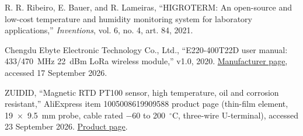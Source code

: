 \documentclass[11pt, letterpaper]{article}
\begin{document}
\begin{enumerate}[label={[\arabic*]}, noitemsep]
\item R. R. Ribeiro, E. Bauer, and R. Lameiras, ``HIGROTERM: An open-source and low-cost temperature and humidity monitoring system for laboratory applications,'' \textit{Inventions}, vol. 6, no. 4, art. 84, 2021.
\item Chengdu Ebyte Electronic Technology Co., Ltd., ``E220-400T22D user manual: 433/470~MHz 22~dBm LoRa wireless module,'' v1.0, 2020. \href{https://www.cdebyte.com/products/E220-400T22D}{Manufacturer page}, accessed 17 September 2026.
\item ZUIDID, ``Magnetic RTD PT100 sensor, high temperature, oil and corrosion resistant,'' AliExpress item 1005008619909588 product page (thin-film element, 19~$\times$~9.5~mm probe, cable rated $-60$ to 200~$^{\circ}$C, three-wire U-terminal), accessed 23 September 2026. \href{https://www.aliexpress.com/item/1005008619909588.html}{Product page}.
\end{enumerate}
\end{document}

